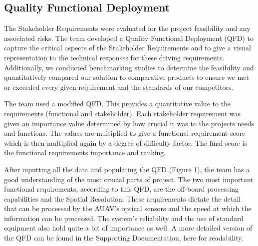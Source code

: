\begin{fullwidth}
\begin{landscape}
    \newpage
\end{landscape}

\subsection{Quality Functional Deployment}
    The Stakeholder Requirements were evaluated for the project feasibility and any associated risks. The team developed a Quality Functional Deployment (QFD) to capture the critical aspects of the Stakeholder Requirements and to give a visual representation to the technical responses for these driving requirements. Additionally, we conducted benchmarking studies to determine the feasibility and quantitatively compared our solution to comparative products to ensure we met or exceeded every given requirement and the standards of our competitors.

    The team used a modified QFD. This provides a quantitative value to the requirements (functional and stakeholder). Each stakeholder requirement was given an importance value determined by how crucial it was to the projects needs and functions. The values are multiplied to give a functional requirement score which is then multiplied again by a degree of difficulty factor. The final score is the functional requirements importance and ranking.

    After inputting all the data and populating the QFD (Figure 1), the team has a good understanding of the most crucial parts of project. The two most important functional requirements, according to this QFD, are the off-board processing capabilities and the Spatial Resolution. These requirements dictate the detail that can be processed by the AUAV’s optical sensors and the speed at which the information can be processed. The system’s reliability and the use of standard equipment also hold quite a bit of importance as well. A more detailed version of the QFD can be found in the Supporting Documentation, here for readability.

\end{fullwidth}

